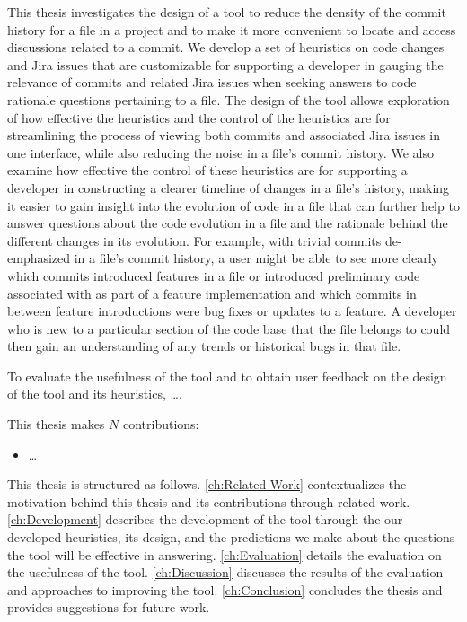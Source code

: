 This thesis investigates the design of a tool to reduce the density of the commit history for a file in a project and to make it more convenient to locate and access discussions related to a commit. 
We develop a set of heuristics on code changes and Jira issues that are customizable for supporting a developer in gauging the relevance of commits and related Jira issues when seeking answers to code rationale questions pertaining to a file.
The design of the tool allows exploration of how effective the heuristics and the control of the heuristics are for streamlining the process of viewing both commits and associated Jira issues in one interface, while also reducing the noise in a file's commit history.
We also examine how effective the control of these heuristics are for supporting a developer in constructing a clearer timeline of changes in a file's history, making it easier to gain insight into the evolution of code in a file that can further help to answer questions about the code evolution in a file and the rationale behind the different changes in its evolution. 
For example, with trivial commits de-emphasized in a file's commit history, a user might be able to see more clearly which commits introduced features in a file or introduced preliminary code associated with as part of a feature implementation and which commits in between feature introductions were bug fixes or updates to a feature.
A developer who is new to a particular section of the code base that the file belongs to could then gain an understanding of any trends or historical bugs in that file.

To evaluate the usefulness of the tool and to obtain user feedback on the design of the tool and its heuristics, \dots {}.

This thesis makes $N$ contributions:
\begin{itemize}
	\item \dots {}
\end{itemize}

This thesis is structured as follows. 
\autoref{ch:Related-Work} contextualizes the motivation behind this thesis and its contributions through related work. 
\autoref{ch:Development} describes the development of the tool through the our developed heuristics, its design, and the predictions we make about the questions the tool will be effective in answering. 
\autoref{ch:Evaluation} details the evaluation on the usefulness of the tool.
\autoref{ch:Discussion} discusses the results of the evaluation and approaches to improving the tool.
\autoref{ch:Conclusion} concludes the thesis and provides suggestions for future work.

\endinput

Any text after an \endinput is ignored.
You could put scraps here or things in progress.
